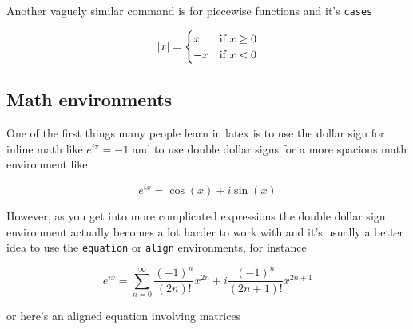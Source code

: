 \documentclass{article}
\begin{document}
Another vaguely similar command is for piecewise functions and it's
\lstinline{cases}

\begin{equation*}
\abs{x} = \begin{cases} x & \text{if } x \geq 0 \\
                       -x & \text{if } x < 0
          \end{cases}
\end{equation*}

\newpage
\subsection*{Math environments}
One of the first things many people learn in latex is to use the dollar sign
for inline math like $e^{i\pi} = -1$ and to use double dollar signs for a
more spacious math environment like

$$
e^{ix} = \cos(x) + i\sin(x)
$$

However, as you get into more complicated expressions the double dollar sign
environment actually becomes a lot harder to work with and it's usually a better
idea to use the \lstinline{equation} or \lstinline{align} environments, for
instance

\begin{equation*}
e^{ix} = \sum_{n=0}^{\infty} \frac{(-1)^n}{(2n)!}x^{2n}
                          + i\frac{(-1)^n}{(2n+1)!}x^{2n+1}
\end{equation*}

or here's an aligned equation involving matrices
\end{document}
